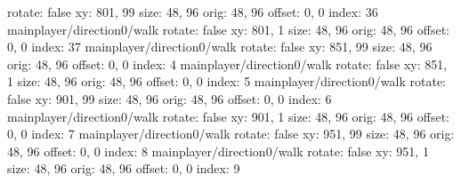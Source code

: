   rotate: false
  xy: 801, 99
  size: 48, 96
  orig: 48, 96
  offset: 0, 0
  index: 36
mainplayer/direction0/walk
  rotate: false
  xy: 801, 1
  size: 48, 96
  orig: 48, 96
  offset: 0, 0
  index: 37
mainplayer/direction0/walk
  rotate: false
  xy: 851, 99
  size: 48, 96
  orig: 48, 96
  offset: 0, 0
  index: 4
mainplayer/direction0/walk
  rotate: false
  xy: 851, 1
  size: 48, 96
  orig: 48, 96
  offset: 0, 0
  index: 5
mainplayer/direction0/walk
  rotate: false
  xy: 901, 99
  size: 48, 96
  orig: 48, 96
  offset: 0, 0
  index: 6
mainplayer/direction0/walk
  rotate: false
  xy: 901, 1
  size: 48, 96
  orig: 48, 96
  offset: 0, 0
  index: 7
mainplayer/direction0/walk
  rotate: false
  xy: 951, 99
  size: 48, 96
  orig: 48, 96
  offset: 0, 0
  index: 8
mainplayer/direction0/walk
  rotate: false
  xy: 951, 1
  size: 48, 96
  orig: 48, 96
  offset: 0, 0
  index: 9

